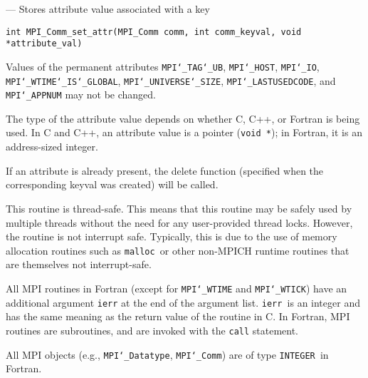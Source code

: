 \startmanpage
{}
--- Stores attribute value associated with a key 
\startvb\begin{verbatim}
int MPI_Comm_set_attr(MPI_Comm comm, int comm_keyval, void *attribute_val)

\end{verbatim}
\endvb

\par
{}
Values of the permanent attributes {\tt MPI{\tt \char`\_}TAG{\tt \char`\_}UB}, {\tt MPI{\tt \char`\_}HOST}, {\tt MPI{\tt \char`\_}IO},
{\tt MPI{\tt \char`\_}WTIME{\tt \char`\_}IS{\tt \char`\_}GLOBAL}, {\tt MPI{\tt \char`\_}UNIVERSE{\tt \char`\_}SIZE}, {\tt MPI{\tt \char`\_}LASTUSEDCODE}, and
{\tt MPI{\tt \char`\_}APPNUM} may not be changed.
\par
The type of the attribute value depends on whether C, C++, or Fortran
is being used.
In C and C++, an attribute value is a pointer ({\tt void *}); in Fortran, it is an
address-sized integer.
\par
If an attribute is already present, the delete function (specified when the
corresponding keyval was created) will be called.
\par
{}
\par
This routine is thread-safe.  This means that this routine may be
safely used by multiple threads without the need for any user-provided
thread locks.  However, the routine is not interrupt safe.  Typically,
this is due to the use of memory allocation routines such as {\tt malloc
}or other non-MPICH runtime routines that are themselves not interrupt-safe.
\par
{}
All MPI routines in Fortran (except for {\tt MPI{\tt \char`\_}WTIME} and {\tt MPI{\tt \char`\_}WTICK}) have
an additional argument {\tt ierr} at the end of the argument list.  {\tt ierr
}is an integer and has the same meaning as the return value of the routine
in C.  In Fortran, MPI routines are subroutines, and are invoked with the
{\tt call} statement.
\par
All MPI objects (e.g., {\tt MPI{\tt \char`\_}Datatype}, {\tt MPI{\tt \char`\_}Comm}) are of type {\tt INTEGER
}in Fortran.
